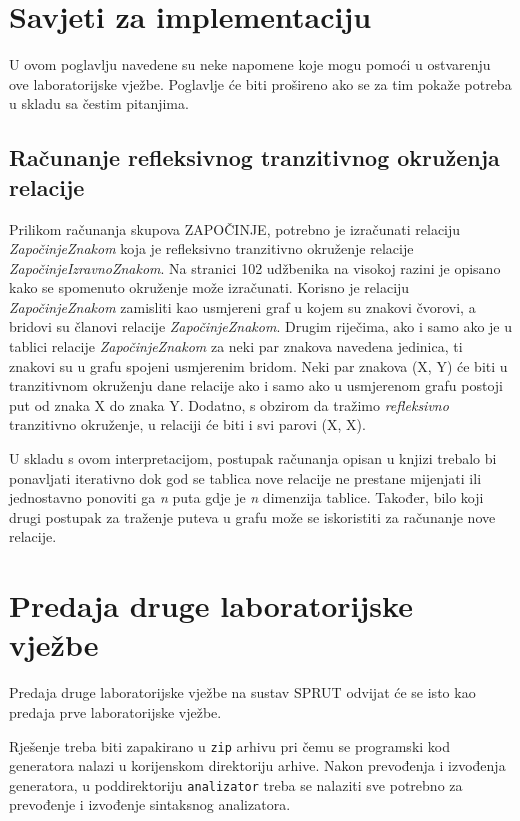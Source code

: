 \documentclass[times, 12pt, utf8]{book}
\begin{document}
\section{Savjeti za implementaciju}
U ovom poglavlju navedene su neke napomene koje mogu pomoći u ostvarenju ove laboratorijske vježbe.
Poglavlje će biti prošireno ako se za tim pokaže potreba u skladu sa čestim pitanjima.

\subsection{Računanje refleksivnog tranzitivnog okruženja relacije}
Prilikom računanja skupova ZAPOČINJE, potrebno je izračunati relaciju {\em ZapočinjeZnakom} koja je refleksivno tranzitivno okruženje relacije {\em ZapočinjeIzravnoZnakom}.
Na stranici 102 udžbenika na visokoj razini je opisano kako se spomenuto okruženje može izračunati.
Korisno je relaciju {\em ZapočinjeZnakom} zamisliti kao usmjereni graf u kojem su znakovi čvorovi, a bridovi su članovi relacije {\em ZapočinjeZnakom}.
Drugim riječima, ako i samo ako je u tablici relacije {\em ZapočinjeZnakom} za neki par znakova navedena jedinica, ti znakovi su u grafu spojeni usmjerenim bridom.
Neki par znakova (X, Y) će biti u tranzitivnom okruženju dane relacije ako i samo ako u usmjerenom grafu postoji put od znaka X do znaka Y.
Dodatno, s obzirom da tražimo {\em refleksivno} tranzitivno okruženje, u relaciji će biti i svi parovi (X, X).

U skladu s ovom interpretacijom, postupak računanja opisan u knjizi trebalo bi ponavljati iterativno dok god se tablica nove relacije ne prestane mijenjati ili jednostavno ponoviti ga {\em n} puta gdje je {\em n} dimenzija tablice.
Također, bilo koji drugi postupak za traženje puteva u grafu može se iskoristiti za računanje nove relacije.

\section{Predaja druge laboratorijske vježbe}
Predaja druge laboratorijske vježbe na sustav SPRUT odvijat će se isto kao predaja prve laboratorijske vježbe.

Rješenje treba biti zapakirano u \texttt{zip} arhivu pri čemu se programski kod generatora nalazi u korijenskom direktoriju arhive.
Nakon prevođenja i izvođenja generatora, u poddirektoriju \texttt{analizator} treba se nalaziti sve potrebno za prevođenje i izvođenje sintaksnog analizatora.
\end{document}
